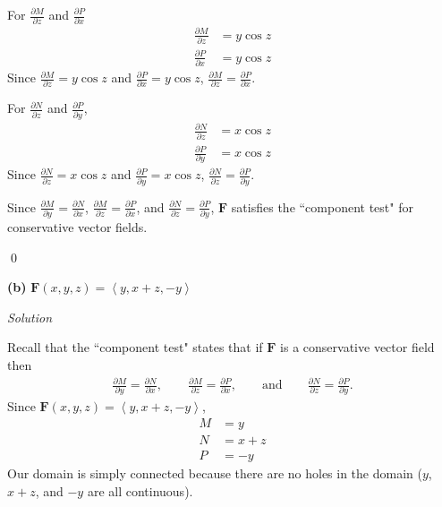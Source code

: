 \documentclass{article}
\newcommand{\lra}[1]{\left\langle #1 \right\rangle}
\newcommand{\F}[0]{\mathbf{F}}
\newcommand{\Solution}{\textit{Solution}}
\begin{document}
{}
For $\displaystyle\frac{\partial M}{\partial z}$ and $\displaystyle\frac{\partial P}{\partial x}$
\begin{align*}
    \frac{\partial M}{\partial z}&=y\cos z\\
    \frac{\partial P}{\partial x}&=
    y\cos z
\end{align*}
Since $\displaystyle\frac{\partial M}{\partial z}=y\cos z$ and $\displaystyle\frac{\partial P}{\partial x}=y\cos z$,  $\displaystyle\frac{\partial M}{\partial z}=\displaystyle\frac{\partial P}{\partial x}$.

{}
For $\displaystyle \frac{\partial N}{\partial z}$ and $\displaystyle\frac{\partial P}{\partial y}$,
\begin{align*}
     \frac{\partial N}{\partial z}&=x\cos z\\
     \frac{\partial P}{\partial y}&=x\cos z
\end{align*}
Since $\displaystyle \frac{\partial N}{\partial z}=x\cos z$ and $\displaystyle\frac{\partial P}{\partial y}=x\cos z$, $\displaystyle \frac{\partial N}{\partial z}=\displaystyle\frac{\partial P}{\partial y}$.

Since $\displaystyle \frac{\partial M}{\partial y}=\frac{\partial N}{\partial x}$, $\displaystyle \frac{\partial M}{\partial z}=\frac{\partial P}{\partial x}$, and $\displaystyle \frac{\partial N}{\partial z}=\frac{\partial P}{\partial y}$, $\F$ satisfies the ``component test" for conservative vector fields.

\qed

{}\textbf{(b)} $\F(x,y,z)=\lra{y,x+z,-y}$

\Solution

Recall that the ``component test" states that if $\F$ is a conservative vector field then
\begin{align*}
    \frac{\partial M}{\partial y}=\frac{\partial N}{\partial x},\hspace{2em}\frac{\partial M}{\partial z}=\frac{\partial P}{\partial x},\hspace{2em} \text{and}\hspace{2em}\frac{\partial N}{\partial z}=\frac{\partial P}{\partial y}.
\end{align*}
Since $\displaystyle\F(x,y,z)=\lra{y,x+z,-y}$, \begin{align*}
    M&=y\\
    N&=x+z\\
    P&=-y
\end{align*}
Our domain is simply connected because there are no holes in the domain ($y$, $x+z$, and $-y$ are all continuous).
\end{document}

